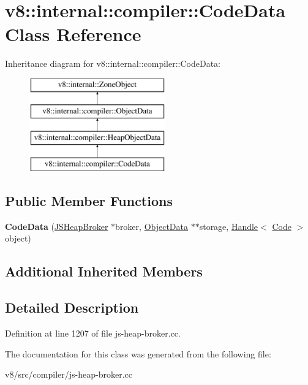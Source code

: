 \hypertarget{classv8_1_1internal_1_1compiler_1_1CodeData}{}\section{v8\+:\+:internal\+:\+:compiler\+:\+:Code\+Data Class Reference}
\label{classv8_1_1internal_1_1compiler_1_1CodeData}
Inheritance diagram for v8\+:\+:internal\+:\+:compiler\+:\+:Code\+Data\+:\begin{figure}[H]
\begin{center}
\leavevmode
\includegraphics[height=4.000000cm]{classv8_1_1internal_1_1compiler_1_1CodeData}
\end{center}
\end{figure}
\subsection*{Public Member Functions}
\begin{DoxyCompactItemize}
\item 
\mbox{\label{classv8_1_1internal_1_1compiler_1_1CodeData_a200bb9eecc8216de7f9c9a1b783d30cc}} 
{\bfseries Code\+Data} (\mbox{\hyperlink{classv8_1_1internal_1_1compiler_1_1JSHeapBroker}{J\+S\+Heap\+Broker}} $\ast$broker, \mbox{\hyperlink{classv8_1_1internal_1_1compiler_1_1ObjectData}{Object\+Data}} $\ast$$\ast$storage, \mbox{\hyperlink{classv8_1_1internal_1_1Handle}{Handle}}$<$ \mbox{\hyperlink{classv8_1_1internal_1_1Code}{Code}} $>$ object)
\end{DoxyCompactItemize}
\subsection*{Additional Inherited Members}


\subsection{Detailed Description}


Definition at line 1207 of file js-\/heap-\/broker.\+cc.



The documentation for this class was generated from the following file\+:\begin{DoxyCompactItemize}
\item 
v8/src/compiler/js-\/heap-\/broker.\+cc\end{DoxyCompactItemize}
